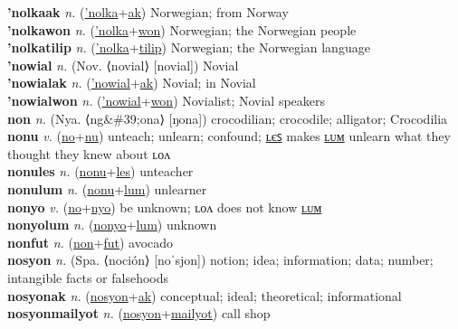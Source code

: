 \textbf{'nolkaak} \textit{n.} (\hyperref['nolka]{'nolka}+\hyperref[ak]{ak})
Norwegian; from Norway \label{'nolkaak} \\
\textbf{'nolkawon} \textit{n.} (\hyperref['nolka]{'nolka}+\hyperref[won]{won})
Norwegian; the Norwegian people \label{'nolkawon} \\
\textbf{'nolkatilip} \textit{n.} (\hyperref['nolka]{'nolka}+\hyperref[tilip]{tilip})
Norwegian; the Norwegian language \label{'nolkatilip} \\
\textbf{'nowial} \textit{n.} (Nov. ⟨novial⟩ [novial])
Novial \label{'nowial} \\
\textbf{'nowialak} \textit{n.} (\hyperref['nowial]{'nowial}+\hyperref[ak]{ak})
Novial; in Novial \label{'nowialak} \\
\textbf{'nowialwon} \textit{n.} (\hyperref['nowial]{'nowial}+\hyperref[won]{won})
Novialist; Novial speakers \label{'nowialwon} \\
\textbf{non} \textit{n.} (Nya. ⟨ng\&\#39;ona⟩ [ŋona])
crocodilian; crocodile; alligator; Crocodilia \label{non} \\
\textbf{nonu} \textit{v.} (\hyperref[no]{no}+\hyperref[nu]{nu})
unteach; unlearn; confound; \hyperref[nonules]{ʟєꜱ} makes \hyperref[nonulum]{ʟᴜᴍ} unlearn what they thought they knew about ʟᴏᴧ \label{nonu} \\
\textbf{nonules} \textit{n.} (\hyperref[nonu]{nonu}+\hyperref[les]{les})
unteacher \label{nonules} \\
\textbf{nonulum} \textit{n.} (\hyperref[nonu]{nonu}+\hyperref[lum]{lum})
unlearner \label{nonulum} \\
\textbf{nonyo} \textit{v.} (\hyperref[no]{no}+\hyperref[nyo]{nyo})
be unknown; ʟᴏᴧ does not know \hyperref[nonyolum]{ʟᴜᴍ} \label{nonyo} \\
\textbf{nonyolum} \textit{n.} (\hyperref[nonyo]{nonyo}+\hyperref[lum]{lum})
unknown \label{nonyolum} \\
\textbf{nonfut} \textit{n.} (\hyperref[non]{non}+\hyperref[fut]{fut})
avocado \label{nonfut} \\
\textbf{nosyon} \textit{n.} (Spa. ⟨noción⟩ [noˈsjon])
notion; idea; information; data; number; intangible facts or falsehoods \label{nosyon} \\
\textbf{nosyonak} \textit{n.} (\hyperref[nosyon]{nosyon}+\hyperref[ak]{ak})
conceptual; ideal; theoretical; informational \label{nosyonak} \\
\textbf{nosyonmailyot} \textit{n.} (\hyperref[nosyon]{nosyon}+\hyperref[mailyot]{mailyot})
call shop \label{nosyonmailyot} \\

